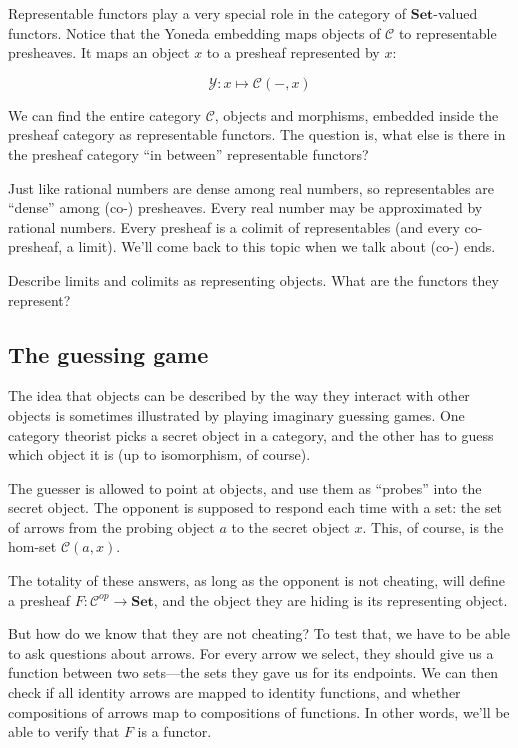 \documentclass[DaoFP]{subfiles}
\begin{document}
Representable functors play a very special role in the category of $ \mathbf{Set}$-valued functors. Notice that the Yoneda embedding maps objects of $\mathcal{C}$ to representable presheaves. It maps an object $x$ to a presheaf represented by $x$: 

\[  \mathcal{Y} \colon x \mapsto \mathcal{C}(-, x) \]

We can find the entire category  $\mathcal{C}$, objects and morphisms, embedded inside the presheaf category as representable functors. The question is, what else is there in the presheaf category ``in between'' representable functors?

Just like rational numbers are dense among real numbers, so representables are ``dense'' among (co-) presheaves. Every real number may be approximated by rational numbers. Every presheaf is a colimit of representables (and every co-presheaf, a limit). We'll come back to this topic when we talk about (co-) ends.

\begin{exercise}
Describe limits and colimits as representing objects. What are the functors they represent?
\end{exercise}

\subsection{The guessing game}

The idea that objects can be described by the way they interact with other objects is sometimes illustrated by playing imaginary guessing games. One category theorist picks a secret object in a category, and the other has to guess which object it is (up to isomorphism, of course). 

The guesser is allowed to point at objects, and use them as ``probes'' into the secret object. The opponent is supposed to respond each time with a set: the set of arrows from the probing object $a$ to the secret object $x$. This, of course, is the hom-set $\mathcal{C}(a, x)$. 

The totality of these answers, as long as the opponent is not cheating, will define a presheaf $F \colon \mathcal{C}^{op} \to \mathbf{Set}$, and the object they are hiding is its representing object. 

But how do we know that they are not cheating? To test that, we have to be able to ask questions about arrows. For every arrow we select, they should give us a function between two sets---the sets they gave us for its endpoints. We can then check if all identity arrows are mapped to identity functions, and whether compositions of arrows map to compositions of functions. In other words, we'll be able to verify that $F$ is a functor. 
\end{document}
